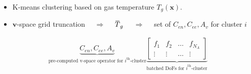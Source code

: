 \documentclass[mathserif, aspectratio=169]{beamer}
\newcommand{\overbar}[1]{\mkern 1.5mu\overline{\mkern-1.5mu#1\mkern-1.5mu}\mkern 1.5mu}
\newcommand{\vect}[1]{\boldsymbol{#1}}
\begin{document}
\begin{frame}
\begin{itemize}
\begin{center}
	\end{center}
	\begin{itemize}
		\item K-means clustering based on gas temperature $T_g(\vect{x})$. 
		\item $\vect{v}$-space grid truncation $\quad\Rightarrow\quad$ $\overbar{T}_g$ $\quad\Rightarrow\quad$ set of $C_{en}, C_{ee}, A_v$ for cluster $i$%
	\end{itemize}
	\pause
	{\footnotesize
	\begin{align*}
		\underbrace{C_{en}, C_{ee}, A_{v}}_{\text{pre-computed v-space operator for $i^{\text{th}}$-cluster}} \underbrace{\begin{bmatrix}
			f_1    & f_2    & \hdots & f_{N_A} \\
			\vdots & \vdots & \hdots &\vdots
		\end{bmatrix}}_{\text{batched DoFs for $i^{\text{th}}$-cluster}}
	\end{align*}}
	\end{itemize}
\end{frame}

			
\end{document}
